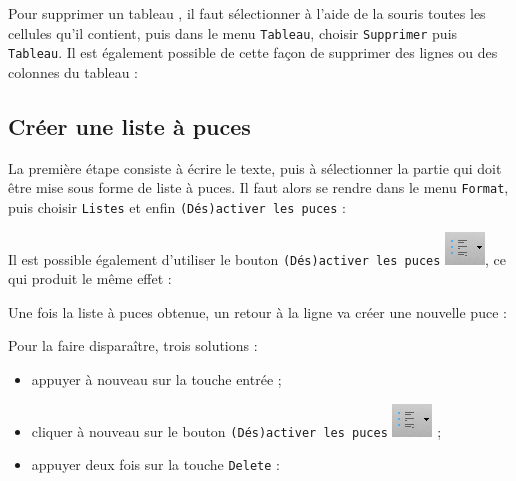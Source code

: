 \vspace{24pt} 

Pour supprimer un tableau , il faut sélectionner à l'aide de la souris toutes les cellules qu'il contient, puis dans le menu \texttt{Tableau}, choisir \texttt{Supprimer} puis \texttt{Tableau}. Il est également possible de cette façon de supprimer des lignes ou des colonnes du tableau :








\subsection{Créer une liste à puces}\label{Texte2ListePuce} 

La première étape consiste à écrire le texte, puis à sélectionner la partie qui doit être mise sous forme de liste à puces. Il faut alors se rendre dans le menu \texttt{Format}, puis choisir \texttt{Listes} et enfin \texttt{(Dés)activer les puces} :      


Il est possible également d'utiliser le bouton \texttt{(Dés)activer les puces} \includegraphics[width=.6cm]{./images/texte02/listePucesIcone}, ce qui produit le même effet :


Une fois la liste à puces obtenue, un retour à la ligne va créer une nouvelle puce :


Pour la faire disparaître, trois solutions :
\begin{itemize}
\item appuyer à nouveau sur la touche entrée ;
\item cliquer à nouveau sur le bouton \texttt{(Dés)activer les puces} \includegraphics[width=.6cm]{./images/texte02/listePucesIcone} ;
\item appuyer deux fois sur la touche \texttt{Delete} :

\end{itemize}







